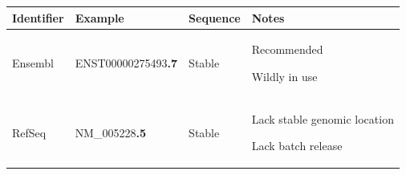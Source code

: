 \begin{SingleSpace}
\begin{table}[tbp]
    \vspace{0.5\baselineskip}
    \begin{subtable}{1\linewidth}
        \centering
        \label{tab:intro-anno-transcript}
        \begin{tabular}{lllp{15em}}
            \toprule
            Identifier      & Example           & Sequence   & Notes \\
            \midrule
            Ensembl         & ENST00000275493\textbf{.7}    & Stable &
            \begin{tablist}
                \item Recommended
                \item Wildly in use
            \end{tablist}\\
            RefSeq          & NM\_005228\textbf{.5}         & Stable &
            \begin{tablist}
                \item Lack stable genomic location
                \item Lack batch release
            \end{tablist}\\
            \bottomrule
        \end{tabular}
    \end{subtable}


\end{table}
\end{SingleSpace}
